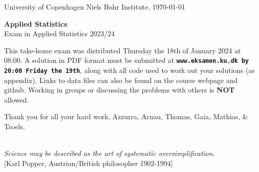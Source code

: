 \documentclass[11pt]{article}
\begin{document}

\noindent
University of Copenhagen \hfill
Niels Bohr Institute, \today \par
\vspace{-2ex}
\noindent
\hrulefill

\vspace{1ex}
\begin{center}
{\bf {\Huge Applied Statistics}}\\
\vspace{1ex}
{\large Exam in Applied Statistics 2023/24}
\end{center}

\vspace{0ex}
\noindent
This take-home exam was distributed Thursday the 18th of January 2024 at 08:00. A solution in PDF format must be submitted at \texttt{\bf www.eksamen.ku.dk by 20:00 Friday the 19th}, along with all code used to work out your solutions (as appendix). Links to data files can also be found on the course webpage and github. Working in groups or discussing the problems with others is {\bf NOT} allowed.

\begin{center}
  Thank you for all your hard work, Azzurra, Arnau, Thomas, Gaia, Mathias, \& Troels.
\end{center}



\noindent
\hrulefill\\
\emph{Science may be described as the art of systematic oversimplification.}\\
  \phantom{foobar} \hfill [Karl Popper, Austrian/British philosopher 1902-1994]\\[-2ex]

  
\vspace{-2ex}
\noindent
\hrulefill
\end{document}
